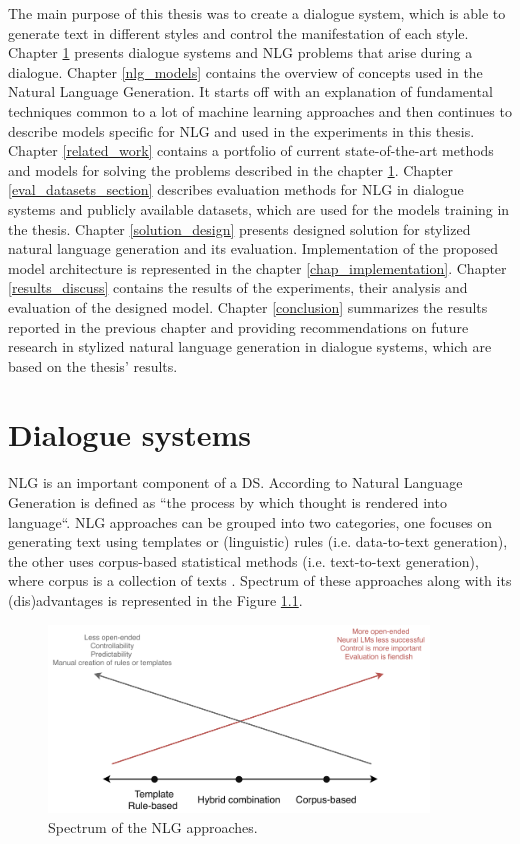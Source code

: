 The main purpose of this thesis was to create a dialogue system, which is able to generate text in different styles and control the manifestation of each style. Chapter \ref{ds_problems} presents dialogue systems and NLG problems that arise during a dialogue. Chapter \ref{nlg_models} contains the overview of concepts used in the Natural Language Generation. It starts off with an explanation of fundamental techniques common to a lot of machine learning approaches and then continues to describe models specific for NLG and used in the experiments in this thesis. Chapter \ref{related_work} contains a portfolio of current state-of-the-art methods and models for solving the problems described in the chapter \ref{ds_problems}. Chapter \ref{eval_datasets_section} describes evaluation methods for NLG in dialogue systems and  publicly available datasets, which are used for the models training in the thesis. Chapter \ref{solution_design} presents designed solution for stylized natural language generation and its evaluation. Implementation of the proposed model architecture is represented in the chapter \ref{chap_implementation}. Chapter \ref{results_discuss} contains the results of the experiments, their analysis and evaluation of the designed model. Chapter \ref{conclusion} summarizes the results reported in the previous chapter and providing recommendations on future research in stylized natural language generation in dialogue systems, which are based on the thesis' results. 

\chapter{Dialogue systems}\label{ds_problems}
NLG is an important component of a DS. According to \cite{alder2017handbook} Natural Language Generation is defined as ``the process by which thought is rendered into language``. NLG approaches can be grouped into two categories, one focuses on generating text using templates or (linguistic) rules (i.e. data-to-text generation), the other uses corpus-based statistical methods (i.e. text-to-text generation), where corpus is a collection of texts \cite{oh2002stochastic}. Spectrum of these approaches along with its (dis)advantages is represented in the Figure \ref{nlg_spectum}.


\begin{figure}[hbt]
  \centering
  \includegraphics[width=0.9\textwidth]{figures/templateVScorpus.pdf}
  \caption{Spectrum of the NLG approaches.}
  \label{nlg_spectum}
\end{figure}

